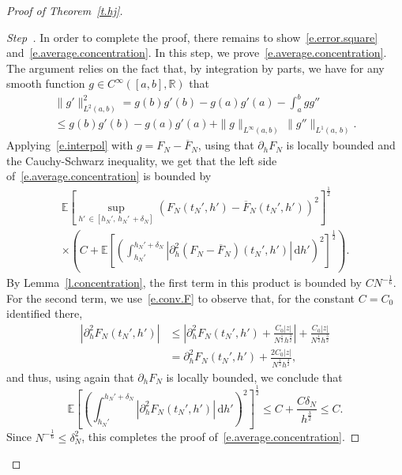 \documentclass[AHL,Unicode,longabstracts,published]{cedram}
\newcommand{\R}{\mathbb{R}}
\newcommand{\E}{\mathbb{E}}
\renewcommand{\d}{\mathrm{d}}
\newcommand{\1}{\mathds{1}}
\renewcommand{\le}{\leqslant}
\renewcommand{\bar}{\overline}
\newcommand{\de}{\delta}
\newcounter{stepcount}
\newenvironment{step}{\refstepcounter{stepcount}\begin{proof}[Step~\thestepcount]}{\let\qed\relax\end{proof}}
\begin{document}
\begin{proof}[Proof of Theorem~\ref{t.hj}]
\begin{step}\label{prooftheo2.1step5}
In order to complete the proof, there remains to show~\eqref{e.error.square} and~\eqref{e.average.concentration}. In this step, we prove~\eqref{e.average.concentration}. The argument relies on the fact that, by integration by parts, we have for any smooth function $g \in C^\infty([a,b],\R)$ that
\begin{multline}\label{e.interpol}
\|g'\|_{L^2(a,b)}^2  = g(b)g'(b) - g(a) g'(a) - \int_a^b g g''
\\
\le g(b)g'(b) - g(a) g'(a) + \|g\|_{L^\infty(a,b)} \, \|g''\|_{L^1(a,\,b)}.
\end{multline}
Applying~\eqref{e.interpol} with $g = F_N - \bar F_N$, using that $\partial_h F_N$ is locally bounded and the Cauchy-Schwarz inequality, we get that the left side of~\eqref{e.average.concentration} is bounded by
\begin{multline*}
\E \left[\sup_{h'\,\in \left[h_N',\,h_N'\,+ \de_N\right]} \left(F_N\left(t_N',h'\right) - \bar F_N\left(t_N',h'\right)\right)^2 \right] ^\frac 1 2
\\
\times \left(C + \E \left[\left(\int_{h_N'}^{h_N' + \de_N} \left|\partial_h^2 \left(F_N - \bar F_N\right)\left(t_N',h'\right) \right|\, \d h' \right)^2 \right]^\frac 1 2\right).
\end{multline*}
By Lemma~\ref{l.concentration}, the first term in this product is bounded by $C N^{-\frac 1 6}$. For the second term, we use~\eqref{e.conv.F} to observe that, for the constant $C = C_0$ identified there,
\begin{align*}
\left|\partial_h^2 F_N\left(t_N',h'\right) \right| & \le \left|\partial_h^2 F_N\left(t_N',h'\right) + \frac{C_0|z|}{N^\frac 1 2 h^\frac 3 2}\right| + \frac{C_0|z|}{N^\frac 1 2 h^\frac 3 2}
\\
& = \partial_h^2 F_N\left(t_N',h'\right) + \frac{2C_0|z|}{N^\frac 1 2 h^\frac 3 2},
\end{align*}
and thus, using again that $\partial_h F_N$ is locally bounded, we conclude that
\[
\E \left[\left(\int_{h_N'}^{h_N' + \de_N} \left|\partial_h^2 F_N(t_N',h') \right|\, \d h' \right)^2 \right]^\frac 1 2 \le C + \frac{C\de_N}{ h^\frac 3 2} \le C.
\]Since $N^{-\frac 1 6} \le \de_N^2$, this completes the proof of~\eqref{e.average.concentration}.
\end{step}




\end{proof}
\end{document}
